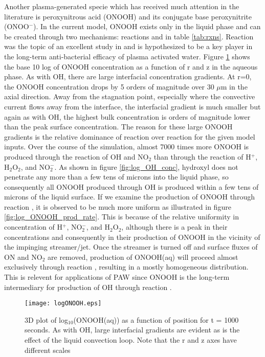 Another plasma-generated specie which has received much attention in the literature is peroxynitrous acid (ONOOH) and its conjugate base peroxynitrite (ONOO$^-$). In the current model, ONOOH exists only in the liquid phase and can be created through two mechanisms: reactions \ONOOHlong{} and \ONOOHshort{} in table \ref{tab:rxns}. Reaction \ONOOHlong{} was the topic of an excellent study in \cite{Lukes2014b} and is hypothesized to be a key player in the long-term anti-bacterial efficacy of plasma activated water. Figure \ref{fig:log_ONOOH_conc} shows the base 10 log of ONOOH concentration as a function of r and z in the aqueous phase. As with OH, there are large interfacial concentration gradients. At r=0, the ONOOH concentration drops by 5 orders of magnitude over 30 $\mu$m in the axial direction. Away from the stagnation point, especially where the convective current flows away from the interface, the interfacial gradient is much smaller but again as with OH, the highest bulk concentration is orders of magnitude lower than the peak surface concentration. The reason for these large ONOOH gradients is the relative dominance of reaction \ONOOHshort{} over reaction \ONOOHlong{} for the given model inputs. Over the course of the simulation, almost 7000 times more ONOOH is produced through the reaction of OH and NO$_2$ than through the reaction of H$^+$, H$_2$O$_2$, and NO$_2^-$. As shown in figure \ref{fig:log_OH_conc}, hydroxyl does not penetrate any more than a few tens of microns into the liquid phase, so consequently all ONOOH produced through OH is produced within a few tens of microns of the liquid surface. If we examine the production of ONOOH through reaction \ONOOHlong{}, it is observed to be much more uniform as illustrated in figure \ref{fig:log_ONOOH_prod_rate}. This is because of the relative uniformity in concentration of H$^+$, NO$_2^-$, and H$_2$O$_2$, although there is a peak in their concentrations and consequently in their production of ONOOH in the vicinity of the impinging streamer/jet. Once the streamer is turned off and surface fluxes of ON and NO$_2$ are removed, production of ONOOH(aq) will proceed almost exclusively through reaction \ONOOHlong{}, resulting in a mostly homogeneous distribution. This is relevent for applications of PAW since ONOOH is the long-term intermediary for production of OH through reaction \OHfromONOOH{}.

\begin{figure}[htb]
    \centering
    \texttt{[image: logONOOH.eps]}
    \caption{3D plot of log$_{10}$(ONOOH(aq)) as a function of position for t = 1000 seconds. As with OH, large interfacial gradients are evident as is the effect of the liquid convection loop. Note that the r and z axes have different scales}
    \label{fig:log_ONOOH_conc}
\end{figure}

